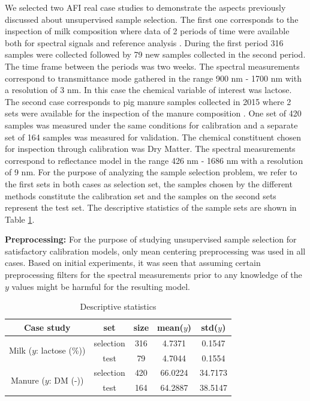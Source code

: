 \documentclass[journal=ancham,manuscript=article]{achemso}
\begin{document}
We selected two AFI real case studies to demonstrate the aspects previously discussed about unsupervised sample selection. The first one corresponds to the inspection of milk composition where data of 2 periods of time were available both for spectral signals and reference analysis \cite{Diaz-Olivares2020}. During the first period 316 samples were collected followed by 79 new samples collected in the second period. The time frame between the periods was two weeks. The spectral measurements correspond to transmittance mode gathered in the range 900 nm - 1700 nm with a resolution of 3 nm. In this case the chemical variable of interest was lactose. 
The second case corresponds to pig manure samples collected in 2015 where 2 sets were available for the inspection of the manure composition \cite{Saeys2005}. One set of 420 samples was measured under the same conditions for calibration and a separate set of 164 samples was measured for validation. The chemical constituent chosen for inspection through calibration was Dry Matter. The spectral measurements correspond to reflectance model in the range 426 nm - 1686 nm with a resolution of 9 nm.
For the purpose of analyzing the sample selection problem, we refer to the first sets in both cases as selection set, the samples chosen by the different methods constitute the calibration set and the samples on the second sets represent the test set. The descriptive statistics of the sample sets are shown in Table \ref{tab_descriptive_statistics}.

\textbf{Preprocessing:} For the purpose of studying unsupervised sample selection for satisfactory calibration models, only mean centering preprocessing was used in all cases. Based on initial experiments, it was seen that assuming certain preprocessing filters for the spectral measurements prior to any knowledge of the $y$ values might be harmful for the resulting model. 

\begin{table}[t]
\centering
\begin{tabular}{|c|c|c|c|c|} 
\hline
Case study	& set & size & mean($y$) & std($y$)  	\\
\hline
\multirow{2}{10em}{Milk ($y$: lactose (\%))} & selection & 316 & 4.7371 & 0.1547\\
& test & 79 & 4.7044 & 0.1554\\
\hline
\multirow{2}{10em}{Manure ($y$: DM (-))} & selection & 420 & 66.0224 & 34.7173\\
& test & 164 & 64.2887 & 38.5147 \\
\hline 


\end{tabular}
\caption{Descriptive statistics}
\label{tab_descriptive_statistics}
\end{table}
\end{document}
